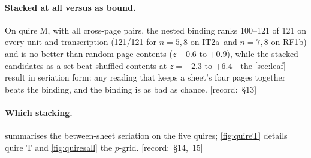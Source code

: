 \documentclass[11pt,a4paper]{article}
\newcommand{\src}[1]{{\footnotesize\color{muted}\sffamily\mbox{[record: \S#1]}}}
\newcommand{\IT}{\textcolor{it2a}{IT2a}}
\newcommand{\RF}{\textcolor{rf1b}{RF1b}}
\begin{document}
\paragraph{Stacked at all versus as bound.} On quire M, with all cross-page pairs, the nested binding ranks 100--121 of 121 on every unit and transcription (121/121 for $n=5,8$ on \IT\ and $n=7,8$ on \RF) and is no better than random page contents ($z$ $-0.6$ to $+0.9$), while the stacked candidates as a set beat shuffled contents at $z=+2.3$ to $+6.4$---the \cref{sec:leaf} result in seriation form: any reading that keeps a sheet's four pages together beats the binding, and the binding is as bad as chance. \src{13}

\paragraph{Which stacking.}  summarises the between-sheet seriation on the five quires; \cref{fig:quireT} details quire T and \cref{fig:quiresall} the $p$-grid. \src{14, 15}
\end{document}
